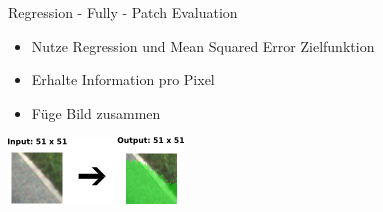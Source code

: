 \begin{frame}{Regression - Fully - Patch Evaluation}
\begin{minipage}{0.59\textwidth}
\begin{itemize}
\item Nutze Regression und Mean Squared Error Zielfunktion \\
\item Erhalte Information pro Pixel
\item Füge Bild zusammen \\
\end{itemize}
\end{minipage}
\begin{minipage}{0.39\textwidth}
	\flushright
      \includegraphics[]{../images/models/fully-conv.png}
\end{minipage}


\end{frame}

